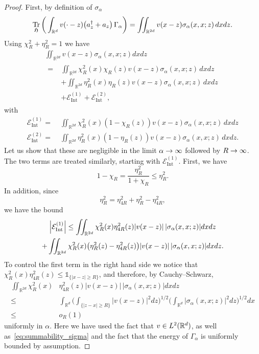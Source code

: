 \documentclass[AHL,Unicode,longabstracts,published]{cedram}
\DeclareMathOperator{\Tr}{Tr}
\DeclareMathOperator{\Intt}{Int}
\newcommand{\R}{\mathbb{R}}
\newcommand{\gH}{\mathfrak{H}}
\newcommand{\cE}{\mathcal{E}}
\newcommand{\1}{\mathds{1}}
\let\oldin\in
\renewcommand{\in}{\mathchoice{\oldin}{\oldin}{\,\oldin\,}{\,\oldin\,}}
\renewcommand*{\to}{\mathchoice{\longrightarrow}{\rightarrow}{\rightarrow}{\rightarrow}}
\let\originalleft\left
\let\originalright\right
\renewcommand{\left}{\mathopen{}\mathclose\bgroup\originalleft}
\renewcommand{\right}{\aftergroup\egroup\originalright}
\begin{document}
\begin{proof}
First, by definition of $\sigma_\alpha$
\begin{equation*}
\Tr_{ \gH}\bigg(\int_{\R^d}v(\cdot-z) \left(a^\dagger_z + a_z\right) \,\Gamma_\alpha\bigg)=\iint_{\R^{2d}}v(x-z) \sigma_\alpha(x,x;z)\, dxdz.
\end{equation*}
Using $\chi_R^2+\eta_R^2=1$ we have
\begin{multline}
\iint_{\R^{2d}}v(x-z)\sigma_{\alpha}(x,x;z)dxdz\\
\begin{aligned}
=\;& \iint_{\R^{2d}} \chi_R^2(x) \chi_R(z) v(x-z)\sigma_{\alpha}(x,x;z)\,dxdz\\
&+\iint_{\R^{2d}} \eta_R^2(x)\eta_R(z) v(x-z) \sigma_\alpha(x,x;z)\, dxdz\\
&+\cE_{\Intt}^{(1)}+\cE_{\Intt}^{(2)},
\end{aligned}
\end{multline}
with
\begin{equation}
\begin{split}
\cE_{\Intt}^{(1)} =\;&\iint_{\R^{2d}} \chi_R^2(x) (1-\chi_R(z))v(x-z)\sigma_{\alpha}(x,x;z)\,dxdz\\
\cE_{\Intt}^{(2)} =\;& \iint_{\R^{2d}}\eta_R^2(x) (1-\eta_R(z))v(x-z)\sigma_{\alpha}(x,x;z)\,dxdz.
\end{split}
\end{equation}
Let us show that these are negligible in the limit $\alpha\to\infty$ followed by $R\to\infty$. The two terms are treated similarly, starting with $\cE_{\Intt}^{(1)}$. First, we have
\begin{equation*}
1-\chi_R= \frac{\eta_R^2}{1+\chi_R} \le \eta_R^2.
\end{equation*}
In addition, since
\begin{equation*}
\eta_R^2=\eta_{4R}^2+ \eta_R^2-\eta_{4R}^2,
\end{equation*}
we have the bound
\begin{multline}\label{eq:partial_decomp_E^1_int}
\left|\cE_{\Intt}^{(1)}\right|\le\iint_{\R^{2d}} \chi_R^2(x) \eta_{4R}^2(z)|v(x-z)|\,|\sigma_{\alpha}(x,x;z)|dxdz\\
+\iint_{\R^{2d}} \chi_R^2(x)\left(\eta_R^2(z)- \eta_{4R}^2(z)\right)|v(x-z)|\,|\sigma_{\alpha}(x,x;z)|dxdz.
\end{multline}
To control the first term in the right hand side we notice that $\chi_R^2(x) \eta_{4R}^2(z) \le \1_{\{|x-z|\ge R\}}$, and therefore, by Cauchy--Schwarz,
\begin{equation*}
\begin{split}
\iint_{\R^{2d}} \chi_R^2(x)& \eta_{4R}^2(z)|v(x-z)|\,|\sigma_{\alpha}(x,x;z)|dxdz \\
\le\;& \int_{\R^d} \bigg(\int_{\{|z-x|\ge R\}}|v(x-z)|^2dz \bigg)^{1/2} \bigg(\int_{\R^d}|\sigma_\alpha(x,x;z)|^2dz \bigg)^{1/2}dx\\
\le\;& o_R(1)
\end{split}
\end{equation*}
uniformly in $\alpha$. Here we have used the fact that $v\in L^2(\R^d)$, as well as~\eqref{eq:summability_sigma} and the fact that the energy of $\Gamma_\alpha$ is uniformly bounded by assumption.


\end{proof}
\end{document}
